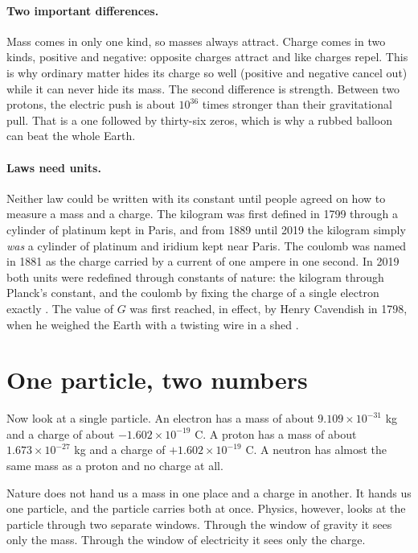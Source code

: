 \paragraph{Two important differences.}
Mass comes in only one kind, so masses always attract. Charge comes in two kinds, positive and negative: opposite charges attract and like charges repel. This is why ordinary matter hides its charge so well (positive and negative cancel out) while it can never hide its mass. The second difference is strength. Between two protons, the electric push is about $10^{36}$ times stronger than their gravitational pull. That is a one followed by thirty-six zeros, which is why a rubbed balloon can beat the whole Earth.

\paragraph{Laws need units.}
Neither law could be written with its constant until people agreed on how to measure a mass and a charge. The kilogram was first defined in 1799 through a cylinder of platinum kept in Paris, and from 1889 until 2019 the kilogram simply \emph{was} a cylinder of platinum and iridium kept near Paris. The coulomb was named in 1881 as the charge carried by a current of one ampere in one second. In 2019 both units were redefined through constants of nature: the kilogram through Planck's constant, and the coulomb by fixing the charge of a single electron exactly \citep{BIPM2019}. The value of $G$ was first reached, in effect, by Henry Cavendish in 1798, when he weighed the Earth with a twisting wire in a shed \citep{Cavendish1798}.

\section{One particle, two numbers}\label{sec:one-particle}

Now look at a single particle. An electron has a mass of about $9.109 \times 10^{-31}$ kg and a charge of about $-1.602 \times 10^{-19}$ C. A proton has a mass of about $1.673 \times 10^{-27}$ kg and a charge of $+1.602 \times 10^{-19}$ C. A neutron has almost the same mass as a proton and no charge at all.

Nature does not hand us a mass in one place and a charge in another. It hands us one particle, and the particle carries both at once. Physics, however, looks at the particle through two separate windows. Through the window of gravity it sees only the mass. Through the window of electricity it sees only the charge.

